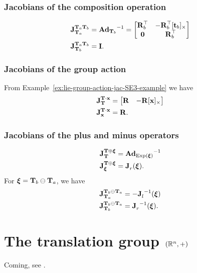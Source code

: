\subsubsection*{Jacobians of the composition operation}
\begin{align}
  \jac{\matT_a \matT_b}{\matT_a} &= {\mAd_{\matT_b}}^{-1} = 
  \begin{bmatrix}
    \matR_b\trans & -\matR_b\trans \skewsymm{\vect_b}\\
    \matr{0} & \matR_b\trans
  \end{bmatrix}\\
  \jac{\matT_a \matT_b}{\matT_b} &= \matI.
\end{align}

\subsubsection*{Jacobians of the group action}
From Example~\ref{ex:lie-group-action-jac-SE3-example} we have
\begin{align}
  \jac{\matT \cdot \vecx}{\matT} &= 
  \begin{bmatrix}
    \matR & -\matR\skewsymm{\vecx}
  \end{bmatrix}\\
  \jac{\matT \cdot \vecx}{\vecx} &= \matR.
\end{align}

\subsubsection*{Jacobians of the plus and minus operators}
\begin{align}
  \jac{\matT \oplus \vecxi}{\matT} &= {\mAd_{\Exp(\vecxi)}}^{-1}\\
  \jac{\matT \oplus \vecxi}{\vecxi} &= \jac{}{r}(\vecxi).
\end{align}
For $\vecxi = \matT_b \ominus \matT_a$, we have
\begin{align}
  \jac{\matT_b \ominus \matT_a}{\matT_a} &= -\jac{}{l}^{-1}(\vecxi)  \label{eq:jacobian-minus-x-SE3}\\
  \jac{\matT_b \ominus \matT_a}{\matT_b} &= \jac{}{r}^{-1}(\vecxi).
\end{align}

\section{The translation group \texorpdfstring{$(\bbR^n, +)$}{}} \label{sec:translation_group}
Coming, see \cite{SolaARobotics}.
